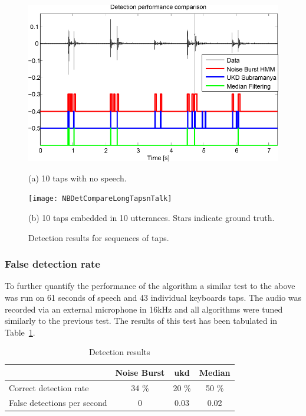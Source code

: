 \begin{figure}
\begin{minipage}[b]{1.0\linewidth}
  \centering
  \centerline{\includegraphics[width=12.5cm]{NBDetCompareLongTaps}}
  \centerline{(a) 10 taps with no speech.}\medskip
\end{minipage}
%
\begin{minipage}[b]{1.0\linewidth}
  \centering
  \centerline{\texttt{[image: NBDetCompareLongTapsnTalk]}}
  \centerline{(b) 10 taps embedded in 10 utterances. Stars indicate ground truth.}\medskip
\end{minipage}
\hfill
%
\caption{Detection results for sequences of taps.}
\label{fig:NBDetectionResults}
\end{figure}

\subsubsection{False detection rate}
To further quantify the performance of the algorithm a similar test to the above was run on 61 seconds of speech and 43 individual keyboards taps. The audio was recorded via an external microphone in 16kHz and all algorithms were tuned similarly to the previous test. The results of this test has been tabulated in Table~\ref{table:NBResultsTest}.

\begin{table}
\caption{Detection results}
\centering
\begin{tabular}{|l | c c c|}
\hline
                            & Noise Burst   & \gls{ukd}       & Median        \\
 \hline
 Correct detection rate     & 34 \%         & 20 \%     & 50 \%         \\
 False detections per second& 0             & 0.03      & 0.02          \\
 \hline
 \end{tabular}
 \label{table:NBResultsTest}
\end{table}

